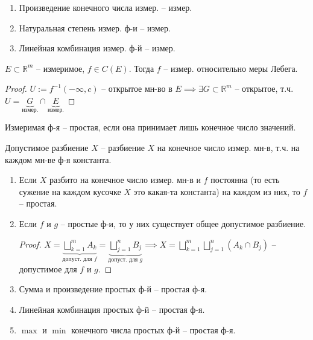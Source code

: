 \begin{consequence}
    \begin{enumerate}
        \item {
            Произведение конечного числа измер. -- измер.
        }
        \item {
            Натуральная степень измер. ф-и -- измер.
        }
        \item {
            Линейная комбинация измер. ф-й -- измер.
        }
    \end{enumerate}
\end{consequence}

\begin{theorem}
    $E \subset \mathbb{R}^{m}$ -- измеримое, $f \in C(E)$. Тогда $f$ -- измер. относительно меры Лебега.
\end{theorem}

\begin{proof}
    $U := f^{-1}(-\infty, c)$ -- открытое мн-во в $E \implies \exists G \subset \mathbb{R}^m$ --  открытое, т.ч. $U = \underbrace{G}_{\text{измер.}} \cap \underbrace{E}_{\text{измер.}}$ 
\end{proof}

\begin{definition}
    Измеримая ф-я -- простая, если она принимает лишь конечное число значений.

    Допустимое разбиение $X$ -- разбиение $X$ на конечное число измер. мн-в, т.ч. на каждом мн-ве ф-я константа.
\end{definition}

\begin{consequence}
    \begin{enumerate}
        \item {
            Если $X$ разбито на конечное число измер. мн-в и $f$ постоянна (то есть сужение на каждом кусочке $X$ это какая-та константа) на каждом из них, то $f$ -- простая.
        }
        \item {
            Если $f$ и $g$ -- простые ф-и, то у них существует общее допустимое разбиение.

            \begin{proof}
                $X = \underbrace{\bigsqcup_{k=1}^{m} A_k}_{\text{допуст. для } f} = \underbrace{\bigsqcup_{j=1}^{n} B_j}_{\text{допуст. для } g} \implies X = \bigsqcup_{k=1}^{m} \bigsqcup_{j=1}^{n} (A_k \cap B_j)$ -- допустимое для $f$ и $g$. 
            \end{proof}
        }
        \item {
            Сумма и произведение простых ф-й -- простая ф-я.
        }
        \item {
            Линейная комбинация простых ф-й -- простая ф-я.
        }
        \item {
            $\max$ и $\min$ конечного числа простых ф-й -- простая ф-я.
        }
    \end{enumerate}
\end{consequence}

